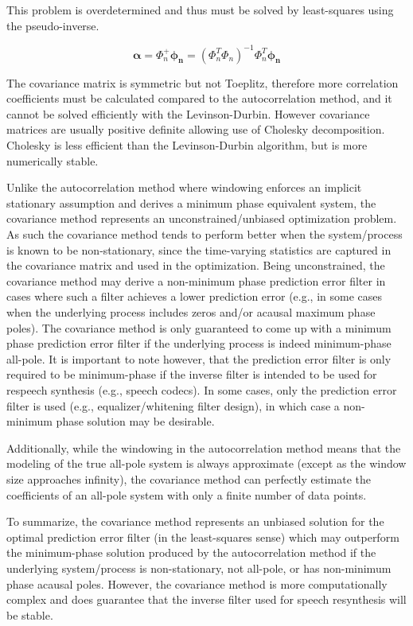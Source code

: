  \noindent
 This problem is overdetermined and thus must be solved by least-squares using the pseudo-inverse. 
 
 \begin{equation}
 	\boldsymbol{\alpha} = \Phi_n^+ \boldsymbol{\phi_n}  = (\Phi_n^T \Phi_n)^{-1} \Phi_n^T  \boldsymbol{\phi_n} 
 \end{equation}
 
The covariance matrix is symmetric but not Toeplitz, therefore more correlation coefficients must be calculated compared to the autocorrelation method, and it cannot be solved efficiently with the Levinson-Durbin. However covariance matrices are usually positive definite allowing use of Cholesky decomposition. Cholesky is less efficient than the Levinson-Durbin algorithm, but is more numerically stable.

Unlike the autocorrelation method where windowing enforces an implicit stationary assumption and derives a minimum phase equivalent system, the covariance method represents an unconstrained/unbiased optimization problem. As such the covariance method tends to perform better when the system/process is known to be non-stationary, since the time-varying statistics are captured in the covariance matrix and used in the optimization. Being unconstrained, the covariance method may derive a non-minimum phase prediction error filter in cases where such a filter achieves a lower prediction error (e.g., in some cases when the underlying process includes zeros and/or acausal maximum phase poles). The covariance method is only guaranteed to come up with a minimum phase prediction error filter if the underlying process is indeed minimum-phase all-pole. It is important to note however, that the prediction error filter is only required to be minimum-phase if the inverse filter is intended to be used for respeech synthesis (e.g., speech codecs). In some cases, only the prediction error filter is used (e.g., equalizer/whitening filter design), in which case a non-minimum phase solution may be desirable.

Additionally, while the windowing in the autocorrelation method means that the modeling of the true all-pole system is always approximate (except as the window size approaches infinity), the covariance method can perfectly estimate the coefficients of an all-pole system with only a finite number of data points.

To summarize, the covariance method represents an unbiased solution for the optimal prediction error filter (in the least-squares sense) which may outperform the minimum-phase solution produced by the autocorrelation method if the underlying system/process is non-stationary, not all-pole, or has non-minimum phase acausal poles. However, the covariance method is more computationally complex and does guarantee that the inverse filter used for speech resynthesis will be stable.

